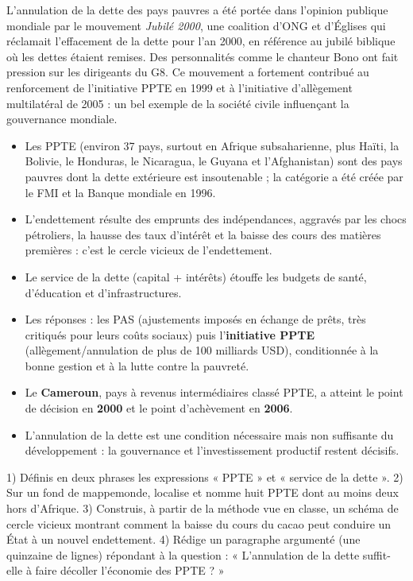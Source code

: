 \documentclass[11pt]{article}
\newcommand{\cle}[1]{{\popxbold\color{popdark}#1}}
\begin{document}
\begin{savaistu}
L'annulation de la dette des pays pauvres a été portée dans l'opinion publique mondiale par le mouvement \emph{Jubilé 2000}, une coalition d'ONG et d'Églises qui réclamait l'effacement de la dette pour l'an 2000, en référence au jubilé biblique où les dettes étaient remises. Des personnalités comme le chanteur Bono ont fait pression sur les dirigeants du G8. Ce mouvement a fortement contribué au renforcement de l'initiative PPTE en 1999 et à l'initiative d'allègement multilatéral de 2005 : un bel exemple de la société civile influençant la gouvernance mondiale.
\end{savaistu}

\begin{aretenir}
\begin{itemize}
\item Les \cle{PPTE} (environ 37 pays, surtout en Afrique subsaharienne, plus Haïti, la Bolivie, le Honduras, le Nicaragua, le Guyana et l'Afghanistan) sont des pays pauvres dont la dette extérieure est insoutenable ; la catégorie a été créée par le FMI et la Banque mondiale en 1996.
\item L'endettement résulte des emprunts des indépendances, aggravés par les chocs pétroliers, la hausse des taux d'intérêt et la baisse des cours des matières premières : c'est le \cle{cercle vicieux de l'endettement}.
\item Le \cle{service de la dette} (capital + intérêts) étouffe les budgets de santé, d'éducation et d'infrastructures.
\item Les réponses : les \cle{PAS} (ajustements imposés en échange de prêts, très critiqués pour leurs coûts sociaux) puis l'\textbf{initiative PPTE} (allègement/annulation de plus de 100 milliards USD), conditionnée à la bonne gestion et à la lutte contre la pauvreté.
\item Le \textbf{Cameroun}, pays à revenus intermédiaires classé PPTE, a atteint le point de décision en \textbf{2000} et le point d'achèvement en \textbf{2006}.
\item L'annulation de la dette est une condition nécessaire mais non suffisante du développement : la gouvernance et l'investissement productif restent décisifs.
\end{itemize}
\end{aretenir}

\begin{exercice}
1) Définis en deux phrases les expressions « PPTE » et « service de la dette ». 2) Sur un fond de mappemonde, localise et nomme huit PPTE dont au moins deux hors d'Afrique. 3) Construis, à partir de la méthode vue en classe, un schéma de cercle vicieux montrant comment la baisse du cours du cacao peut conduire un État à un nouvel endettement. 4) Rédige un paragraphe argumenté (une quinzaine de lignes) répondant à la question : « L'annulation de la dette suffit-elle à faire décoller l'économie des PPTE ? »
\end{exercice}
\end{document}
